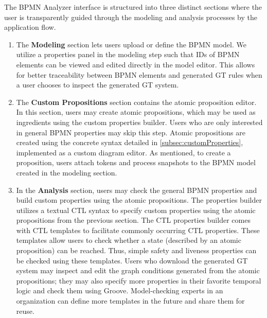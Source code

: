 \documentclass{lmcs} %
\begin{document}

The BPMN Analyzer interface is structured into three distinct sections where the user is transparently guided through the modeling and analysis processes by the application flow.

\begin{enumerate}
  \item The \textbf{Modeling} section lets users upload or define the BPMN model.
  We utilize a properties panel in the modeling step such that IDs of BPMN elements can be viewed and edited directly in the model editor.
  This allows for better traceability between BPMN elements and generated GT rules when a user chooses to inspect the generated GT system.
  \item The \textbf{Custom Propositions} section contains the atomic proposition editor.
  In this section, users may create atomic propositions, which may be used as ingredients using the custom properties builder.
  Users who are only interested in general BPMN properties may skip this step.
  Atomic propositions are created using the concrete syntax detailed in \autoref{subsec:customProperties}, implemented as a custom diagram editor.
  As mentioned, to create a proposition, users attach tokens and process snapshots to the BPMN model created in the modeling section.
  \item In the \textbf{Analysis} section, users may check the general BPMN properties and build custom properties using the atomic propositions. 
  The properties builder utilizes a textual CTL syntax to specify custom properties using the atomic propositions from the previous section.
  The CTL properties builder comes with CTL templates to facilitate commonly occurring CTL properties.
  These templates allow users to check whether a state (described by an atomic proposition) can be reached.
  Thus, simple safety and liveness properties can be checked using these templates.
  Users who download the generated GT system may inspect and edit the graph conditions generated from the atomic propositions; they may also specify more properties in their favorite temporal logic and check them using Groove.
  Model-checking experts in an organization can define more templates in the future and share them for reuse. 

\end{enumerate}
\end{document}
